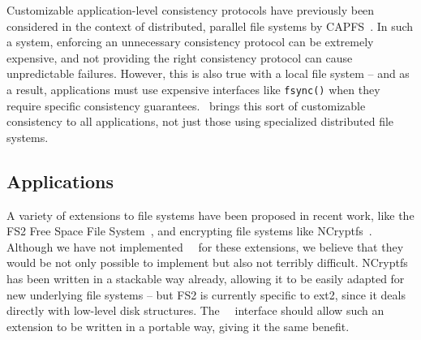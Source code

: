 Customizable application-level consistency protocols have previously been
considered in the context of distributed, parallel file systems by
CAPFS~\cite{vilayannur05providing}. In such a system, enforcing an unnecessary
consistency protocol can be extremely expensive, and not providing the right
consistency protocol can cause unpredictable failures. However, this is also
true with a local file system -- and as a result, applications must use
expensive interfaces like \texttt{fsync()} when they require specific
consistency guarantees. \Kudos\ brings this sort of customizable consistency to
all applications, not just those using specialized distributed file systems.


\subsection{Applications}

A variety of extensions to file systems have been proposed in recent work, like
the FS2 Free Space File System~\cite{huang05fs2}, and encrypting file systems
like NCryptfs~\cite{wright01ncryptfs}. Although we have not implemented \Kudos\
\modules\ for these extensions, we believe that they would be not only possible
to implement but also not terribly difficult. NCryptfs has been written in a
stackable way already, allowing it to be easily adapted for new underlying file
systems -- but FS2 is currently specific to ext2, since it deals directly with
low-level disk structures. The \Kudos\ \module\ interface should allow such an
extension to be written in a portable way, giving it the same benefit.
